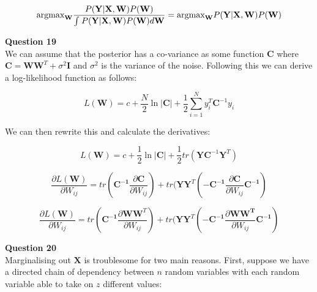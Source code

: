 \documentclass[10pt, a4paper, twocolumn]{article} %
\begin{document}
\begin{enumerate}
\begin{enumerate}
\begin{equation}
    \text{argmax}_\mathbf{W}\frac{P(\mathbf{Y}|\mathbf{X},\mathbf{W})P(\mathbf{W})}{\int_{}^{} P(\mathbf{Y}|\mathbf{X},\mathbf{W})P(\mathbf{W})d\mathbf{W}}\\
    = \text{argmax}_\mathbf{W}P(\mathbf{Y}|\mathbf{X},\mathbf{W})P(\mathbf{W})
\end{equation}
    
    
\end{enumerate}
   
\textbf{Question 19}\\
  We can assume that the posterior has a co-variance as some function $\mathbf{C}$
  where $\mathbf{C} = \mathbf{W}\mathbf{W}^T + \sigma^2\mathbf{I}$ and $\sigma^2$ is the variance of the noise. Following this we can derive a log-likelihood function as follows:
  
  \begin{equation}
    L(\mathbf{W}) = c + \frac{N}{2}\ln{|\mathbf{C}|} +  \frac{1}{2}\sum_{i=1}^{N} y_i^T\mathbf{C}^{-1}y_i
  \end{equation}
  
  We can then rewrite this and calculate the derivatives:
  
  \begin{equation}
      L(\mathbf{W}) = c + \frac{1}{2}\ln{|\mathbf{C}|} +  \frac{1}{2}tr(\mathbf{Y}\mathbf{C}^{-1}\mathbf{Y}^T)
  \end{equation}
  
  \begin{equation}
      \frac{\partial L(\mathbf{W})}{\partial W_{ij}} = tr(\mathbf{C^{-1}}\frac{\partial \mathbf{C}}{\partial W_{ij}}) 
    + tr(\mathbf{Y}\mathbf{Y}^T(-\mathbf{C^{-1}} \frac{ \partial \mathbf{C}}{\partial W_{ij}} \mathbf{C^{-1}})
  \end{equation}
  
  \begin{equation}
     \frac{\partial L(\mathbf{W})}{\partial W_{ij}} = tr(\mathbf{C^{-1}}\frac{\partial \mathbf{W}\mathbf{W}^T}{\partial W_{ij}}) + tr(\mathbf{Y}\mathbf{Y}^T(-\mathbf{C^{-1}} \frac{ \partial \mathbf{\mathbf{W}\mathbf{W}^T}}{\partial W_{ij}} \mathbf{C^{-1}})
    \end{equation}
  
  \textbf{Question 20}\\
  Marginalising out $\mathbf{X}$ is troublesome for two main reasons. First, suppose we have a directed chain of dependency between $n$ random variables with each random variable able to take on $z$ different values:
  

\end{enumerate}
\end{document}
